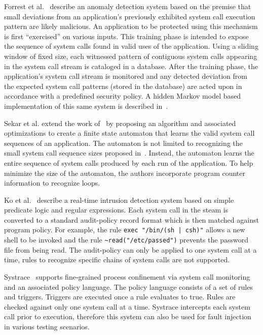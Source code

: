 Forrest et al.~\cite{DBLP:conf/sp/ForrestHSL96} describe
an anomaly detection system based on the premise that small deviations from
an application's previously exhibited system call execution pattern are likely
malicious. An application to be protected using this mechanism is first
``exercised'' on various inputs. This training phase is intended to expose the
sequence of system calls found in valid uses of the application.
Using a sliding
window of fixed size,
each witnessed pattern of contiguous system calls appearing in the system call stream is cataloged in a database. After the
training phase, the application's system call stream
is monitored and any detected
deviation from the expected system call patterns (stored in the database) are
acted upon in accordance with a predefined security policy.
A hidden Markov model
based implementation of this same system
is described in~\cite{DBLP:conf/sp/WarrenderFP99}.

Sekar et al.\cite{DBLP:conf/sp/SekarBDB01} extend the work of~\cite{DBLP:conf/sp/ForrestHSL96} by proposing an algorithm and associated optimizations to create a finite state automaton that learns the valid system call sequences of an application.
The automaton is not limited to recognizing the small system call sequence sizes proposed in~\cite{DBLP:conf/sp/ForrestHSL96}.
Instead, the automaton learns the entire sequence of system calls produced by each run of the application.
To help minimize the size of the automaton, the authors incorporate program counter information to recognize loops.

Ko et al.~\cite{DBLP:conf/acsac/KoFL94} describe a real-time intrusion detection system
based on simple predicate logic and regular expressions. Each system call in the
steam is converted to a standard audit-policy record format which is then
matched against program policy. For example, the rule \lstinline+exec "/bin/(sh | csh)"+
allows a new shell to be invoked and the rule \lstinline+~read("/etc/passed")+ prevents the
password file from being read. The audit-policy can only be applied to one
system call at a time, rules to recognize specific chains of system calls are
not supported.

Systrace~\cite{DBLP:conf/uss/Provos03} supports fine-grained process confinement via system call monitoring and an associated policy language.
The policy language consists of a set of rules and triggers.
Triggers are executed once a rule evaluates to true. Rules are checked against only one system call at a time.
Systrace intercepts each system call prior to execution, therefore this system can also be used for fault injection in various testing scenarios.

